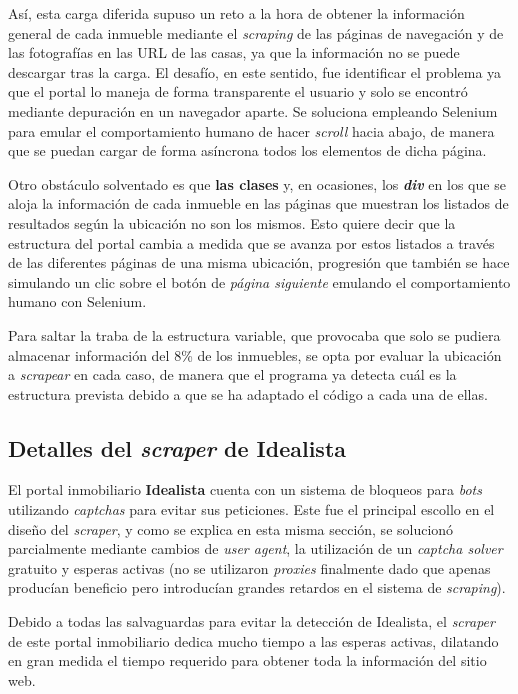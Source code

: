 \documentclass[12pt]{article}
\begin{document}
Así, esta carga diferida supuso un reto a la hora de obtener la información general de cada inmueble mediante el \textit{scraping} de las páginas de navegación y de las fotografías en las URL de las casas, ya que la información no se puede descargar tras la carga. El desafío, en este sentido, fue identificar el problema ya que el portal lo maneja de forma transparente el usuario y solo se encontró  mediante depuración en un navegador aparte. Se soluciona empleando Selenium para emular el comportamiento humano de hacer \textit{scroll} hacia abajo, de manera que se puedan cargar de forma asíncrona todos los elementos de dicha página.

Otro obstáculo solventado es que \textbf{las clases} y, en ocasiones, los \textbf{\textit{div}} en los que se aloja la información de cada inmueble en las páginas que muestran los listados de resultados según la ubicación no son los mismos. Esto quiere decir que la estructura del portal cambia a medida que se avanza por estos listados a través de las diferentes páginas de una misma ubicación, progresión que también se hace simulando un clic sobre el botón de \textit{página siguiente} emulando el comportamiento humano con Selenium. 

Para saltar la traba de la estructura variable, que provocaba que solo se pudiera almacenar información del 8\% de los inmuebles, se opta por evaluar la ubicación a \textit{scrapear} en cada caso, de manera que el programa ya detecta cuál es la estructura prevista debido a que se ha adaptado el código a cada una de ellas.

\vspace{-1.5em}\subsection*{Detalles del \textit{scraper} de Idealista}\vspace{-1em}

El portal inmobiliario \textbf{Idealista} cuenta con un sistema de bloqueos para \textit{bots} utilizando \textit{captchas} para evitar sus peticiones. Este fue el principal escollo en el diseño del \textit{scraper}, y como se explica en esta misma sección, se solucionó parcialmente mediante cambios de \textit{user agent}, la utilización de un \textit{captcha solver} gratuito y esperas activas (no se utilizaron \textit{proxies} finalmente dado que apenas producían beneficio pero introducían grandes retardos en el sistema de \textit{scraping}).

Debido a todas las salvaguardas para evitar la detección de Idealista, el \textit{scraper} de este portal inmobiliario dedica mucho tiempo a las esperas activas, dilatando en gran medida el tiempo requerido para obtener toda la información del sitio web. 
\end{document}
